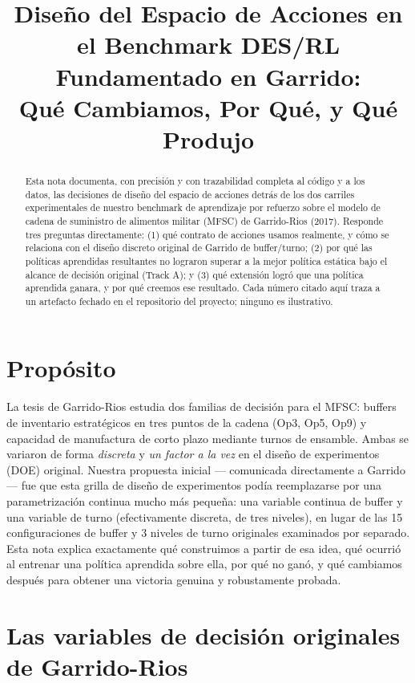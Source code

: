 \documentclass[11pt]{article}
\title{Diseño del Espacio de Acciones en el Benchmark DES/RL Fundamentado en Garrido:\\
Qué Cambiamos, Por Qué, y Qué Produjo}
\author{}
\date{}
\begin{document}
\maketitle

\begin{abstract}
\noindent Esta nota documenta, con precisión y con trazabilidad completa
al código y a los datos, las decisiones de diseño del espacio de acciones
detrás de los dos carriles experimentales de nuestro benchmark de
aprendizaje por refuerzo sobre el modelo de cadena de suministro de
alimentos militar (MFSC) de Garrido-Rios (2017). Responde tres preguntas
directamente: (1) qué contrato de acciones usamos realmente, y cómo se
relaciona con el diseño discreto original de Garrido de buffer/turno; (2)
por qué las políticas aprendidas resultantes no lograron superar a la
mejor política estática bajo el alcance de decisión original (Track A); y
(3) qué extensión logró que una política aprendida ganara, y por qué
creemos ese resultado. Cada número citado aquí traza a un artefacto
fechado en el repositorio del proyecto; ninguno es ilustrativo.
\end{abstract}

\section{Propósito}

La tesis de Garrido-Rios estudia dos familias de decisión para el MFSC:
buffers de inventario estratégicos en tres puntos de la cadena (Op3, Op5,
Op9) y capacidad de manufactura de corto plazo mediante turnos de
ensamble. Ambas se variaron de forma \emph{discreta} y \emph{un factor a
la vez} en el diseño de experimentos (DOE) original. Nuestra propuesta
inicial --- comunicada directamente a Garrido --- fue que esta grilla de
diseño de experimentos podía reemplazarse por una parametrización
continua mucho más pequeña: una variable continua de buffer y una
variable de turno (efectivamente discreta, de tres niveles), en lugar de
las 15 configuraciones de buffer y 3 niveles de turno originales
examinados por separado. Esta nota explica exactamente qué construimos a
partir de esa idea, qué ocurrió al entrenar una política aprendida sobre
ella, por qué no ganó, y qué cambiamos después para obtener una victoria
genuina y robustamente probada.

\section{Las variables de decisión originales de Garrido-Rios}
\label{sec:garrido}
\end{document}
